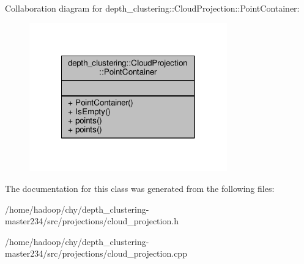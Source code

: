 Collaboration diagram for depth\-\_\-clustering\-:\-:Cloud\-Projection\-:\-:Point\-Container\-:
\nopagebreak
\begin{figure}[H]
\begin{center}
\leavevmode
\includegraphics[width=242pt]{classdepth__clustering_1_1CloudProjection_1_1PointContainer__coll__graph}
\end{center}
\end{figure}


The documentation for this class was generated from the following files\-:\begin{DoxyCompactItemize}
\item 
/home/hadoop/chy/depth\-\_\-clustering-\/master234/src/projections/cloud\-\_\-projection.\-h\item 
/home/hadoop/chy/depth\-\_\-clustering-\/master234/src/projections/cloud\-\_\-projection.\-cpp\end{DoxyCompactItemize}
